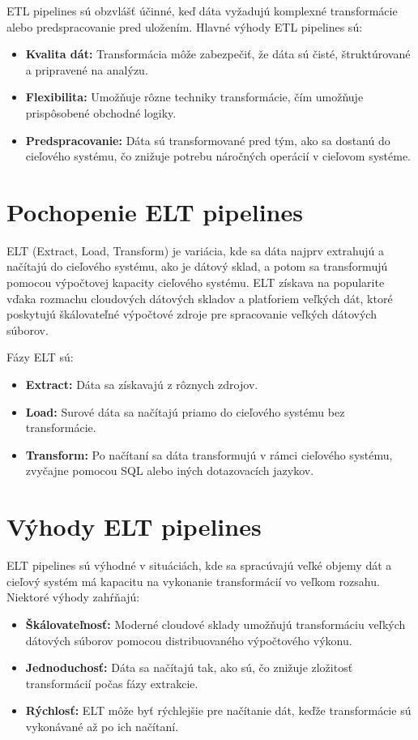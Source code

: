 \documentclass{article}
\begin{document}
ETL pipelines sú obzvlášť účinné, keď dáta vyžadujú komplexné transformácie alebo predspracovanie pred uložením. Hlavné výhody ETL pipelines sú:

\begin{itemize}
    \item \textbf{Kvalita dát:} Transformácia môže zabezpečiť, že dáta sú čisté, štruktúrované a pripravené na analýzu.
    \item \textbf{Flexibilita:} Umožňuje rôzne techniky transformácie, čím umožňuje prispôsobené obchodné logiky.
    \item \textbf{Predspracovanie:} Dáta sú transformované pred tým, ako sa dostanú do cieľového systému, čo znižuje potrebu náročných operácií v cieľovom systéme.
\end{itemize}

\section{Pochopenie ELT pipelines}

ELT (Extract, Load, Transform) je variácia, kde sa dáta najprv extrahujú a načítajú do cieľového systému, ako je dátový sklad, a potom sa transformujú pomocou výpočtovej kapacity cieľového systému. ELT získava na popularite vďaka rozmachu cloudových dátových skladov a platforiem veľkých dát, ktoré poskytujú škálovateľné výpočtové zdroje pre spracovanie veľkých dátových súborov.

Fázy ELT sú:

\begin{itemize}
    \item \textbf{Extract:} Dáta sa získavajú z rôznych zdrojov.
    \item \textbf{Load:} Surové dáta sa načítajú priamo do cieľového systému bez transformácie.
    \item \textbf{Transform:} Po načítaní sa dáta transformujú v rámci cieľového systému, zvyčajne pomocou SQL alebo iných dotazovacích jazykov.
\end{itemize}

\section{Výhody ELT pipelines}

ELT pipelines sú výhodné v situáciách, kde sa spracúvajú veľké objemy dát a cieľový systém má kapacitu na vykonanie transformácií vo veľkom rozsahu. Niektoré výhody zahŕňajú:

\begin{itemize}
    \item \textbf{Škálovateľnosť:} Moderné cloudové sklady umožňujú transformáciu veľkých dátových súborov pomocou distribuovaného výpočtového výkonu.
    \item \textbf{Jednoduchosť:} Dáta sa načítajú tak, ako sú, čo znižuje zložitosť transformácií počas fázy extrakcie.
    \item \textbf{Rýchlosť:} ELT môže byť rýchlejšie pre načítanie dát, keďže transformácie sú vykonávané až po ich načítaní.
\end{itemize}
\end{document}
